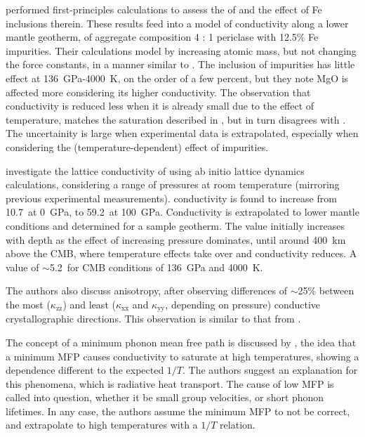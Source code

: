 \citet{Tang2014} performed first-principles calculations to assess the \tcs of \mgsios
and the effect of Fe inclusions therein. These results feed into a model of conductivity along a lower mantle geotherm, of aggregate composition 4 \bdg : 1 periclase with 12.5\% Fe impurities. Their calculations model \mgfesios by increasing atomic mass, but not changing the force constants, in a manner similar to \citet{Ammann2014}. The inclusion of impurities has little effect at 136~GPa-4000~K, on the order of a few percent, but they note MgO is affected more considering its higher conductivity. The observation that conductivity is reduced less when it is already small due to the effect of temperature, matches the saturation described in \citet{Ammann2014}, but in turn disagrees with \citet{Haigis2012}. The uncertainity is large when experimental data is extrapolated, especially when considering the (temperature-dependent) effect of impurities.

\citet{Ghaderi2017} investigate the lattice conductivity of \bdgs using ab initio lattice dynamics calculations, considering a range of pressures at room temperature (mirroring previous experimental measurements). \mgsios conductivity is found to increase from 10.7~\wmk at 0~GPa, to 59.2~\wmk at 100~GPa. Conductivity is extrapolated to lower mantle conditions and determined for a sample geotherm. The value initially increases with depth as the effect of increasing pressure dominates, until around 400~km above the CMB, where temperature effects take over and conductivity reduces. A value of $\sim$5.2~\wmk for CMB conditions of 136~GPa and 4000~K. 

The authors also discuss anisotropy, after observing differences of $\sim$25\% between the most ($\kappa_{\mathrm{zz}}$) and least ($\kappa_{\mathrm{xx}}$ and $\kappa_{\mathrm{yy}}$, depending on pressure) conductive crystallographic directions. This observation is similar to that from \citet{Ammann2014}.

The concept of a minimum phonon mean free path is discussed by \citet{Ghaderi2017}, the idea that a minimum MFP causes conductivity to saturate at high temperatures, showing a dependence different to the expected $1/T$. The authors suggest an explanation for this phenomena, which is radiative heat transport. The cause of low MFP is called into question, whether it be small group velocities, or short phonon lifetimes. In any case, the authors assume the minimum MFP to not be correct, and extrapolate to high temperatures with a $1/T$ relation.

